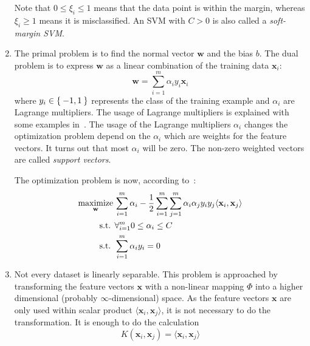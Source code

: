 \begin{enumerate}
          Note that \(0 \le \xi_i \le 1\) means that the data point is within
          the margin, whereas \(\xi_i \ge 1\) means it is misclassified. An
          \gls{SVM} with $C > 0$ is also called a \textit{soft-margin \gls{SVM}}.
    \item The primal problem is to find the normal vector $\mathbf{w}$ and the
          bias $b$. The dual problem is to express $\mathbf{w}$ as a linear
          combination of the training data $\mathbf{x}_i$:
          \[\mathbf{w} = \sum_{i=1}^m \alpha_i y_i \mathbf{x}_i\]
          where $y_i \in \Set{-1, 1}$ represents the class of the training
          example and $\alpha_i$ are Lagrange multipliers. The usage of
          Lagrange multipliers is explained with some examples
          in~\cite{smithlagrange}. The usage of the Lagrange multipliers
          $\alpha_i$ changes the optimization problem depend on the
          $\alpha_i$ which are weights for the feature vectors. It turns
          out that most $\alpha_i$ will be zero. The non-zero weighted vectors
          are called \textit{support vectors}.

          The optimization problem is now, according to~\cite{burges1998tutorial}:
          \begin{equation*}
          \begin{aligned}
              \operatorname*{maximize}_{\mathbf{w}}\,& \sum_{i=1}^m \alpha_i - \frac{1}{2} \sum_{i=1}^m \sum_{j=1}^m \alpha_i \alpha_j y_i y_j \langle \mathbf{x}_i, \mathbf{x}_j \rangle\\
              \text{s.t. } & \forall_{i=1}^m 0 \leq \alpha_i \leq C\\
              \text{s.t. } & \sum_{i=1}^m \alpha_i y_i = 0
          \end{aligned}
          \end{equation*}
    \item Not every dataset is linearly separable. This problem is approached
          by transforming the feature vectors $\mathbf{x}$ with a non-linear
          mapping $\Phi$ into a higher dimensional (probably
          $\infty$-dimensional) space. As the feature vectors $\mathbf{x}$
          are only used within scalar product
          $\langle \mathbf{x}_i, \mathbf{x}_j \rangle$, it is not necessary to
          do the transformation. It is enough to do the calculation
          \[K(\mathbf{x}_i, \mathbf{x}_j) = \langle \mathbf{x}_i, \mathbf{x}_j \rangle\]


\end{enumerate}
